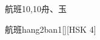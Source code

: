 \begin{entry}{航班}{10,10}{⾈、⽟}
  \begin{phonetics}{航班}{hang2ban1}[][HSK 4]
  \end{phonetics}
\end{entry}
